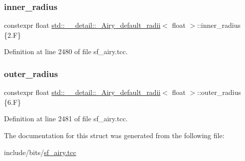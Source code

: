 \subsubsection{\texorpdfstring{inner\+\_\+radius}{inner\_radius}}
{\footnotesize\ttfamily constexpr float \hyperlink{structstd_1_1____detail_1_1__Airy__default__radii}{std\+::\+\_\+\+\_\+detail\+::\+\_\+\+Airy\+\_\+default\+\_\+radii}$<$ float $>$\+::inner\+\_\+radius \{2.\+F\}\hspace{0.3cm}{\ttfamily [static]}}



Definition at line 2480 of file sf\+\_\+airy.\+tcc.

\mbox{\label{structstd_1_1____detail_1_1__Airy__default__radii_3_01float_01_4_ad8ea3a344f9748cf9bf32bcc17ca5d0b}} 
\subsubsection{\texorpdfstring{outer\+\_\+radius}{outer\_radius}}
{\footnotesize\ttfamily constexpr float \hyperlink{structstd_1_1____detail_1_1__Airy__default__radii}{std\+::\+\_\+\+\_\+detail\+::\+\_\+\+Airy\+\_\+default\+\_\+radii}$<$ float $>$\+::outer\+\_\+radius \{6.\+F\}\hspace{0.3cm}{\ttfamily [static]}}



Definition at line 2481 of file sf\+\_\+airy.\+tcc.



The documentation for this struct was generated from the following file\+:\begin{DoxyCompactItemize}
\item 
include/bits/\hyperlink{sf__airy_8tcc}{sf\+\_\+airy.\+tcc}\end{DoxyCompactItemize}
